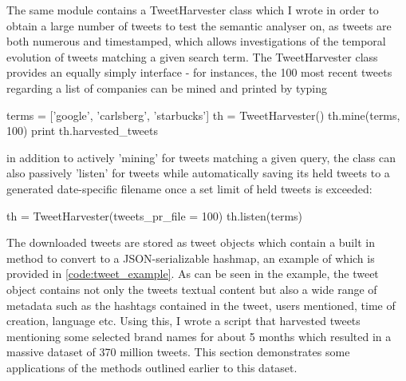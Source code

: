 The same module contains a TweetHarvester class which I wrote in order to obtain a large number of tweets to test the semantic analyser on, as tweets are both numerous and timestamped, which allows investigations of the temporal evolution of tweets matching a given search term. The TweetHarvester class provides an equally simply interface - for instances, the 100 most recent tweets regarding a list of companies can be mined and printed by typing
\begin{snippet}[language=python]
	terms = ['google', 'carlsberg', 'starbucks']
	th = TweetHarvester()
	th.mine(terms, 100)
	print th.harvested_tweets
\end{snippet}
in addition to actively 'mining' for tweets matching a given query, the class can also passively 'listen' for tweets while automatically saving its held tweets to a generated date-specific filename once a set limit of held tweets is exceeded:
\begin{snippet}[language=python]
	th = TweetHarvester(tweets_pr_file = 100)
	th.listen(terms)
\end{snippet}
The downloaded tweets are stored as tweet objects which contain a built in method to convert to a JSON-serializable hashmap, an example of which is provided in \ref{code:tweet_example}.
%
%
As can be seen in the example, the tweet object contains not only the tweets textual content but also a wide range of metadata such as the hashtags contained in the tweet, users mentioned, time of creation, language etc. Using this, I wrote a script that harvested tweets mentioning some selected brand names for about 5 months which resulted in a massive dataset of 370 million tweets. This section demonstrates some applications of the methods outlined earlier to this dataset.

\FloatBarrier
